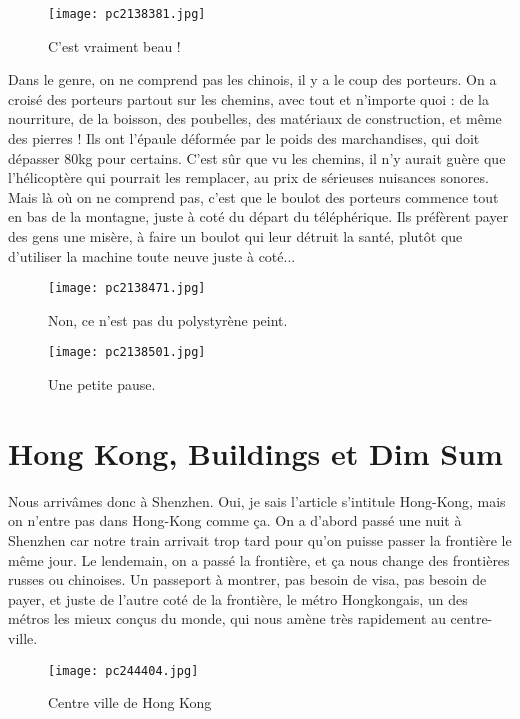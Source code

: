 \documentclass{book}
\begin{document}
\begin{figure}[h]
\centering
\texttt{[image: pc2138381.jpg]}
\caption*{C'est vraiment beau !}
\end{figure}


Dans le genre, on ne comprend pas les chinois, il y a le coup des porteurs. On a croisé des porteurs partout sur les chemins, avec tout et n'importe quoi : de la nourriture, de la boisson, des poubelles, des matériaux de construction, et même des pierres ! Ils ont l'épaule déformée par le poids des marchandises, qui doit dépasser 80kg pour certains. C'est sûr que vu les chemins, il n'y aurait guère que l'hélicoptère qui pourrait les remplacer, au prix de sérieuses nuisances sonores. Mais là où on ne comprend pas, c'est que le boulot des porteurs commence tout en bas de la montagne, juste à coté du départ du téléphérique. Ils préfèrent payer des gens une misère, à faire un boulot qui leur détruit la santé, plutôt que d'utiliser la machine toute neuve juste à coté...


\begin{figure}[h]
\centering
\texttt{[image: pc2138471.jpg]}
\caption*{Non, ce n'est pas du polystyrène peint.}
\end{figure}


\begin{figure}[h]
\centering
\texttt{[image: pc2138501.jpg]}
\caption*{Une petite pause.}
\end{figure}



\chapter{Hong Kong, Buildings et Dim Sum}


Nous arrivâmes donc à Shenzhen. Oui, je sais l'article s'intitule Hong-Kong, mais on n'entre pas dans Hong-Kong comme ça. On a d'abord passé une nuit à Shenzhen car notre train arrivait trop tard pour qu'on puisse passer la frontière le même jour. Le lendemain, on a passé la frontière, et ça nous change des frontières russes ou chinoises. Un passeport à montrer, pas besoin de visa, pas besoin de payer, et juste de l'autre coté de la frontière, le métro Hongkongais, un des métros les mieux conçus du monde, qui nous amène très rapidement au centre-ville.


\begin{figure}[h]
\centering
\texttt{[image: pc244404.jpg]}
\caption*{Centre ville de Hong Kong}
\end{figure}
\end{document}
